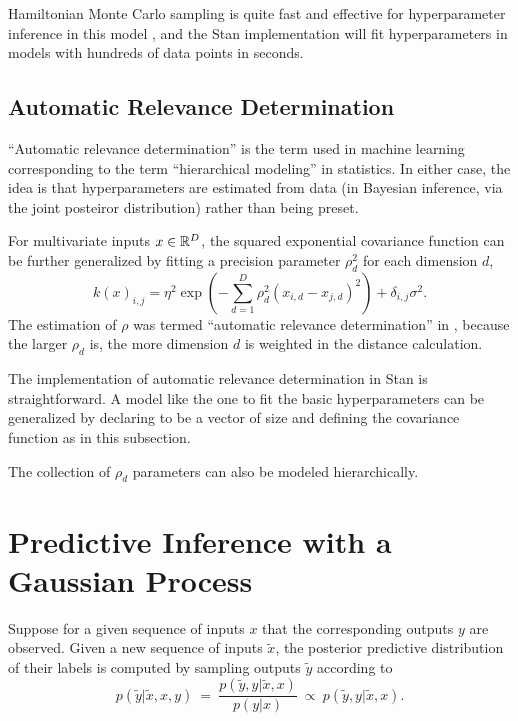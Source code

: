 Hamiltonian Monte Carlo sampling is quite fast and effective for
hyperparameter inference in this model \citep{Neal:1997}, and the Stan
implementation will fit hyperparameters in models with hundreds of
data points in seconds.

\subsection{Automatic Relevance Determination}

``Automatic relevance determination'' is the term used in machine
learning corresponding to the term ``hierarchical modeling'' in
statistics.  In either case, the idea is that hyperparameters are
estimated from data (in Bayesian inference, via the joint posteiror
distribution) rather than being preset.

For multivariate inputs $x \in \mathbb{R}^D$, the squared exponential
covariance function can be further generalized by fitting a precision
parameter $\rho_d^2$ for each dimension $d$,
\[
k(x)_{i,j} = \eta^2 \exp 
\left(
- \sum_{d=1}^D \rho_d^2 (x_{i,d} - x_{j,d})^2
\right)
+ \delta_{i,j}\sigma^2.
\]
The estimation of $\rho$ was termed ``automatic relevance
determination'' in \citep{Neal:1996}, because the larger $\rho_d$ is,
the more dimension $d$ is weighted in the distance calculation.

The implementation of automatic relevance determination in Stan is
straightforward.  A model like the one to fit the basic
hyperparameters can be generalized by declaring  to be a
vector of size  and defining the covariance function as in
this subsection.

The collection of $\rho_d$ parameters can also be modeled
hierarchically.


\section{Predictive Inference with a Gaussian Process}

Suppose for a given sequence of inputs $x$ that the corresponding
outputs $y$ are observed.  Given a new sequence of inputs $\tilde{x}$,
the posterior predictive distribution of their labels is computed by
sampling outputs $\tilde{y}$ according to
\[
p(\tilde{y}|\tilde{x},x,y)
\ = \
\frac{p(\tilde{y}, y|\tilde{x},x)}
     {p(y|x)}
\ \propto \
p(\tilde{y}, y|\tilde{x},x).
\]

